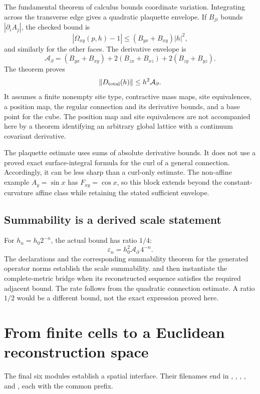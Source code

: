 The fundamental theorem of calculus bounds coordinate variation. Integrating across the transverse edge gives a quadratic plaquette envelope. If \(B_{ji}\) bounds \(|\partial_iA_j|\), the checked bound is
\[
 |\Omega_{xy}(p,h)-1|\le(B_{yx}+B_{xy})|h|^2,
\]
and similarly for the other faces. The derivative envelope is
\[
 \mathcal A_\partial
 =(B_{yx}+B_{xy})+2(B_{zx}+B_{xz})+2(B_{zy}+B_{yz}).
\]
The theorem  proves
\[
 \left\lVert D_{\mathrm{total}}(h)\right\rVert\le h^2\mathcal A_\partial.
\]
It assumes a finite nonempty site type, contractive mass maps, site equivalences, a position map, the regular connection and its derivative bounds, and a base point for the cube. The position map and site equivalences are not accompanied here by a theorem identifying an arbitrary global lattice with a continuum covariant derivative.

The plaquette estimate uses sums of absolute derivative bounds. It does not use a proved exact surface-integral formula for the curl of a general connection. Accordingly, it can be less sharp than a curl-only estimate. The non-affine example \(A_y=\sin x\) has \(F_{xy}=\cos x\), so this block extends beyond the constant-curvature affine class while retaining the stated sufficient envelope.

\subsection{Summability is a derived scale statement}

For \(h_n=h_0 2^{-n}\), the actual bound has ratio \(1/4\):
\[
 \varepsilon_n=h_0^2\mathcal A_\partial\,4^{-n}.
\]
The declarations  and the corresponding summability theorem for the generated operator norms establish the scale summability.  and \mbox{} then instantiate the complete-metric bridge when its reconstructed sequence satisfies the required adjacent bound. The rate follows from the quadratic connection estimate. A ratio \(1/2\) would be a different bound, not the exact expression proved here.

\section{From finite cells to a Euclidean reconstruction space}

The final six modules establish a spatial interface. Their filenames end in , , , ,  and , each with the common  prefix.

